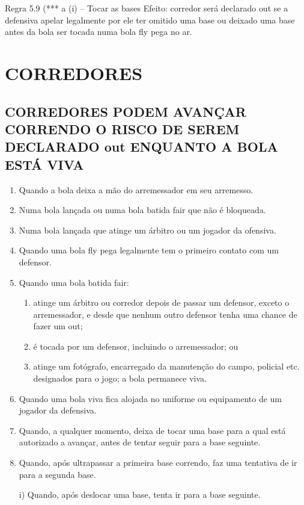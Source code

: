 Regra 5.9 (*** a (i) -- Tocar as bases
 Efeito:
 corredor será declarado \gls{out} se a defensiva apelar legalmente por ele ter omitido uma base ou deixado uma base antes da bola ser tocada numa bola \gls{fly} pega no ar.

\section{CORREDORES}

\subsection{CORREDORES PODEM AVANÇAR CORRENDO O RISCO DE SEREM DECLARADO \gls{out} ENQUANTO A BOLA ESTÁ VIVA}
\begin{enumerate}[label=(\alph*)]\item   Quando a bola deixa a mão do arremessador em seu arremesso.
	\item  Numa bola lançada ou numa bola batida \gls{fair} que não é bloqueada.
	\item  Numa bola lançada que atinge um árbitro ou um jogador da ofensiva.
	\item  Quando uma bola \gls{fly} pega legalmente tem o primeiro contato com um defensor.
	\item  Quando uma bola batida \gls{fair}:

	 \begin{enumerate}[label=\roman*.]
	 	\item  atinge um árbitro ou corredor depois de passar um defensor, exceto o arremessador, e desde que nenhum outro defensor tenha uma chance de	 fazer um \gls{out};
		\item é tocada por um defensor, incluindo o arremessador; ou
	 	\item atinge um fotógrafo, encarregado da manutenção do campo, policial etc. designados para o jogo; a bola permanece viva.
	\end{enumerate}

	\item  Quando uma bola viva fica alojada no uniforme ou equipamento de um jogador da defensiva.
	\item   Quando, a qualquer momento, deixa de tocar uma base para a qual está autorizado a avançar, antes de tentar seguir para a base seguinte.
	\item   Quando, após ultrapassar a primeira base correndo, faz uma tentativa de ir para a segunda base.

	 i) Quando, após deslocar uma base, tenta ir para a base seguinte.


\end{enumerate}
